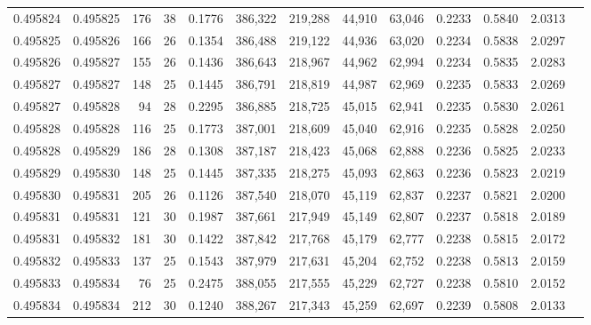 \begin{tabular}{rrrrrrrrrrrrr}
0.495824 & 0.495825 & 176 &  38 &                                     0.1776 & 386,322 & 219,288 &  44,910 &  63,046 & 0.2233 & 0.5840 & 2.0313 \\
0.495825 & 0.495826 & 166 &  26 &                                     0.1354 & 386,488 & 219,122 &  44,936 &  63,020 & 0.2234 & 0.5838 & 2.0297 \\
0.495826 & 0.495827 & 155 &  26 &                                     0.1436 & 386,643 & 218,967 &  44,962 &  62,994 & 0.2234 & 0.5835 & 2.0283 \\
0.495827 & 0.495827 & 148 &  25 &                                     0.1445 & 386,791 & 218,819 &  44,987 &  62,969 & 0.2235 & 0.5833 & 2.0269 \\
0.495827 & 0.495828 &  94 &  28 &                                     0.2295 & 386,885 & 218,725 &  45,015 &  62,941 & 0.2235 & 0.5830 & 2.0261 \\
0.495828 & 0.495828 & 116 &  25 &                                     0.1773 & 387,001 & 218,609 &  45,040 &  62,916 & 0.2235 & 0.5828 & 2.0250 \\
0.495828 & 0.495829 & 186 &  28 &                                     0.1308 & 387,187 & 218,423 &  45,068 &  62,888 & 0.2236 & 0.5825 & 2.0233 \\
0.495829 & 0.495830 & 148 &  25 &                                     0.1445 & 387,335 & 218,275 &  45,093 &  62,863 & 0.2236 & 0.5823 & 2.0219 \\
0.495830 & 0.495831 & 205 &  26 &                                     0.1126 & 387,540 & 218,070 &  45,119 &  62,837 & 0.2237 & 0.5821 & 2.0200 \\
0.495831 & 0.495831 & 121 &  30 &                                     0.1987 & 387,661 & 217,949 &  45,149 &  62,807 & 0.2237 & 0.5818 & 2.0189 \\
0.495831 & 0.495832 & 181 &  30 &                                     0.1422 & 387,842 & 217,768 &  45,179 &  62,777 & 0.2238 & 0.5815 & 2.0172 \\
0.495832 & 0.495833 & 137 &  25 &                                     0.1543 & 387,979 & 217,631 &  45,204 &  62,752 & 0.2238 & 0.5813 & 2.0159 \\
0.495833 & 0.495834 &  76 &  25 &                                     0.2475 & 388,055 & 217,555 &  45,229 &  62,727 & 0.2238 & 0.5810 & 2.0152 \\
0.495834 & 0.495834 & 212 &  30 &                                     0.1240 & 388,267 & 217,343 &  45,259 &  62,697 & 0.2239 & 0.5808 & 2.0133 \\

\end{tabular}
